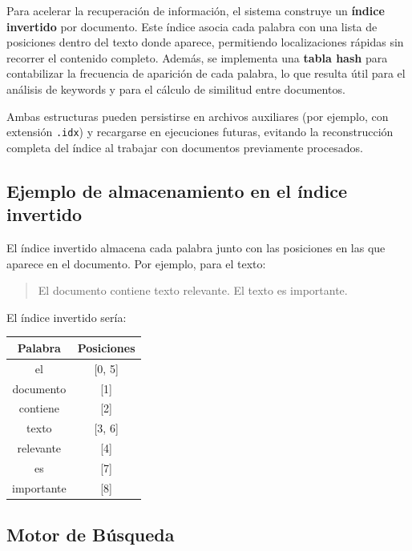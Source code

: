 \documentclass[9pt,letterpaper,onecolumn]{rho-class/rho}
\begin{document}
Para acelerar la recuperación de información, el sistema construye un \textbf{índice invertido} por documento. Este índice asocia cada palabra con una lista de posiciones dentro del texto donde aparece, permitiendo localizaciones rápidas sin recorrer el contenido completo. Además, se implementa una \textbf{tabla hash} para contabilizar la frecuencia de aparición de cada palabra, lo que resulta útil para el análisis de keywords y para el cálculo de similitud entre documentos.

Ambas estructuras pueden persistirse en archivos auxiliares (por ejemplo, con extensión \texttt{.idx}) y recargarse en ejecuciones futuras, evitando la reconstrucción completa del índice al trabajar con documentos previamente procesados.


\subsection{Ejemplo de almacenamiento en el índice invertido}

El índice invertido almacena cada palabra junto con las posiciones en las que aparece en el documento. Por ejemplo, para el texto:

\begin{quote}
El documento contiene texto relevante. El texto es importante.
\end{quote}

El índice invertido sería:

\begin{center}
\begin{tabular}{|c|c|}
\hline
\textbf{Palabra} & \textbf{Posiciones} \\
\hline
el & [0, 5] \\
documento & [1] \\
contiene & [2] \\
texto & [3, 6] \\
relevante & [4] \\
es & [7] \\
importante & [8] \\
\hline
\end{tabular}
\end{center}

\subsection{Motor de Búsqueda}
\end{document}
